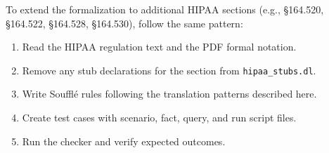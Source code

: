 \documentclass[11pt,letterpaper]{article}
\begin{document}
To extend the formalization to additional HIPAA sections (e.g., \S 164.520, \S 164.522, \S 164.528, \S 164.530), follow the same pattern:
\begin{enumerate}
  \item Read the HIPAA regulation text and the PDF formal notation.
  \item Remove any stub declarations for the section from \texttt{hipaa\_stubs.dl}.
  \item Write Souffl\'{e} rules following the translation patterns described here.
  \item Create test cases with scenario, fact, query, and run script files.
  \item Run the checker and verify expected outcomes.
\end{enumerate}


\end{document}
